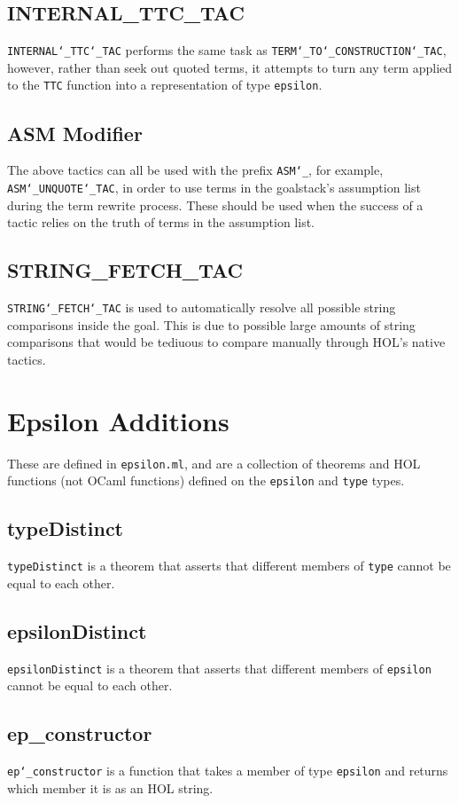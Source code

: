 \documentclass{article}
\def\c#1{\texttt{#1}}
\begin{document}
\subsection{INTERNAL\_TTC\_TAC}
\c{INTERNAL\char`\_TTC\char`\_TAC} performs the same task as \c{TERM\char`\_TO\char`\_CONSTRUCTION\char`\_TAC}, however, rather than seek out quoted terms, it attempts to turn any term applied to the \c{TTC} function into a representation of type \c{epsilon}.

\subsection{ASM Modifier}
The above tactics can all be used with the prefix \c{ASM\char`\_}, for example, \c{ASM\char`\_UNQUOTE\char`\_TAC}, in order to use terms in the goalstack's assumption list during the term rewrite process. These should be used when the success of a tactic relies on the truth of terms in the assumption list. 

\subsection{STRING\_FETCH\_TAC}
\c{STRING\char`\_FETCH\char`\_TAC} is used to automatically resolve all possible string comparisons inside the goal. This is due to possible large amounts of string comparisons that would be tediuous to compare manually through HOL's native tactics.

\section{Epsilon Additions}
These are defined in \c{epsilon.ml}, and are a collection of theorems and HOL functions (not OCaml functions) defined on the \c{epsilon} and \c{type} types.

\subsection{typeDistinct}
\c{typeDistinct} is a theorem that asserts that different members of \c{type} cannot be equal to each other.

\subsection{epsilonDistinct}
\c{epsilonDistinct} is a theorem that asserts that different members of \c{epsilon} cannot be equal to each other.

\subsection{ep\_constructor}
\c{ep\char`\_constructor} is a function that takes a member of type \c{epsilon} and returns which member it is as an HOL string.
\end{document}

